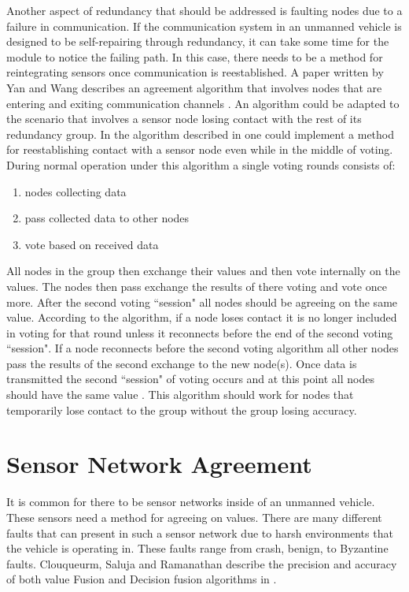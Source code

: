\documentclass[twoside, conference]{IEEEtran}
\begin{document}
Another aspect of redundancy that should be addressed is faulting nodes due to a failure in communication. If the communication system in an unmanned vehicle is designed to be self-repairing through redundancy, it can take some time for the module to notice the failing path. In this case, there needs to be a method for reintegrating sensors once communication is reestablished. A paper written by Yan and Wang describes an agreement algorithm that involves nodes that are entering and exiting communication channels \cite{Yan2007}. An algorithm could be adapted to the scenario that involves a sensor node losing contact with the rest of its redundancy group. In the algorithm described in \cite{Yan2007} one could implement a method for reestablishing contact with a sensor node even while in the middle of voting. During normal operation under this algorithm a single voting rounds consists of:
\begin{enumerate}
	\item nodes collecting data
	\item pass collected data to other nodes 
	\item vote based on received data
\end{enumerate} 
All nodes in the group then exchange their values and then vote internally on the values. The nodes then pass exchange the results of there voting and vote once more. After the second voting ``session" all nodes should be agreeing on the same value. According to the algorithm, if a node loses contact it is no longer included in voting for that round unless it reconnects before the end of the second voting ``session". If a node reconnects before the second voting algorithm all other nodes pass the results of the second exchange to the new node(s). Once data is transmitted the second ``session" of voting occurs and at this point all nodes should have the same value \cite{Yan2007}. This algorithm should work for nodes that temporarily lose contact to the group without the group losing accuracy.

\section{Sensor Network Agreement}\label{sec:sensornet-agreement}
It is common for there to be sensor networks inside of an unmanned vehicle. These sensors need a method for agreeing on values. There are many different faults that can present in such a sensor network due to harsh environments that the vehicle is operating in. These faults range from crash, benign, to Byzantine faults. Clouqueurm, Saluja and Ramanathan describe the precision and accuracy of both value Fusion and Decision fusion algorithms in \cite{clouqueur2004}. 
\end{document}
